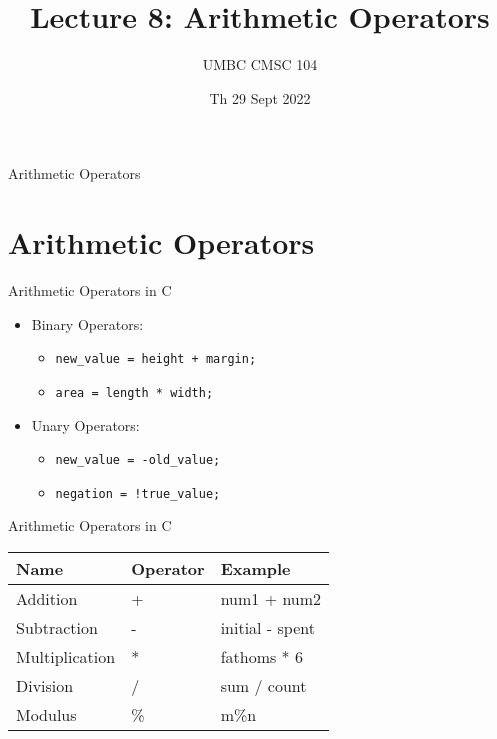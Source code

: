 \documentclass[graphics]{beamer}
\title{Lecture 8: Arithmetic Operators}
\author{UMBC CMSC 104}
\date{Th 29 Sept 2022}
\begin{document}
\begin{frame}{}
\centering
    Arithmetic Operators
\end{frame}

\frame{\tableofcontents}

\section{Arithmetic Operators}\label{sec:athricop}
\begin{frame}{Arithmetic Operators in C}
    \begin{itemize}
        \item Binary Operators:
        \begin{itemize}
            \item \texttt{new\_value = height + margin;}
            \item \texttt{area = length * width;}
        \end{itemize}
        \item Unary Operators:
        \begin{itemize}
            \item \texttt{new\_value = -old\_value;}
            \item \texttt{negation = !true\_value;}
        \end{itemize}
    \end{itemize}
\end{frame}

\begin{frame}{Arithmetic Operators in C}
    \begin{tabular}{l l l}
        Name & Operator & Example  \\ \hline
        Addition & + & num1 + num2 \\
        Subtraction & - & initial - spent \\
        Multiplication & * & fathoms * 6 \\
        Division & / & sum / count \\
        Modulus & \% & m\%n
    \end{tabular}
\end{frame}
\end{document}
